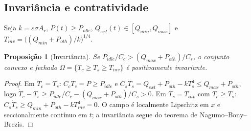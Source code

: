 \documentclass[12pt,a4paper]{article}
\newtheorem{prop}{Proposição}
\begin{document}
\subsection{Invariância e contratividade}\label{sec:contr}
Seja $k=\varepsilon\sigma A_r$, $P(t)\ge P_{idle}$,
$Q_{ext}(t)\in[Q_{min},Q_{max}]$ e $T_{inv}=\big((Q_{min}+P_{oth})/k\big)^{1/4}$.

\begin{prop}[Invariância]\label{prop:inv}
Se $P_{idle}/C_c>(Q_{max}+P_{oth})/C_s$, o conjunto convexo e fechado
$\Omega=\{T_c\ge T_s\ge T_{inv}\}$ é positivamente invariante.
\end{prop}
\begin{proof}
Em $T_c=T_s$: $C_c\dot T_c=P\ge P_{idle}$ e
$C_s\dot T_s=Q_{ext}+P_{oth}-kT_s^4\le Q_{max}+P_{oth}$, logo
$\dot T_c-\dot T_s\ge P_{idle}/C_c-(Q_{max}+P_{oth})/C_s>0$. Em
$T_s=T_{inv}$ com $T_c\ge T_s$: $C_s\dot T_s\ge Q_{min}+P_{oth}-kT_{inv}^4=0$.
O campo é localmente Lipschitz em $x$ e seccionalmente contínuo em $t$; a
invariância segue do teorema de Nagumo--Bony--Brezis.
\end{proof}
\end{document}
